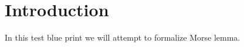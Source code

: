 \chapter*{Introduction}
\label{cha:intro}

In this test blue print we will attempt to formalize Morse lemma.